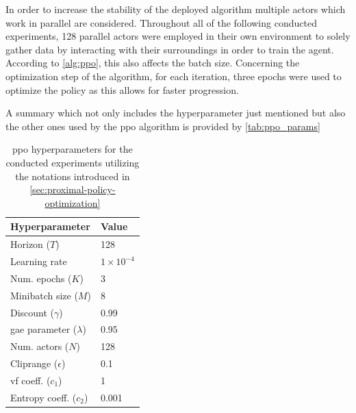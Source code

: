 \documentclass[draft,final]{vutinfth} %
\begin{document}
    In order to increase the stability of the deployed algorithm multiple actors which work in parallel are considered.
    Throughout all of the following conducted experiments, 128 parallel actors were employed in their own environment to solely gather data by interacting with their surroundings in order to train the agent.
    According to \autoref{alg:ppo}, this also affects the batch size.
    Concerning the optimization step of the algorithm, for each iteration, three epochs were used to optimize the policy as this allows for faster progression.

    A summary which not only includes the hyperparameter just mentioned but also the other ones used by the \gls{ppo} algorithm is provided by \autoref{tab:ppo_params}

    \begin{table}[h]
        \centering
        \begin{tabular}{|l|l|}
            \hline
            Hyperparameter                       & Value              \\
            \hline
            Horizon ($T$)                        & 128                \\
            Learning rate                        & $1 \times 10^{-4}$ \\
            Num. epochs  ($K$)                     & 3                  \\
            Minibatch size ($M$)                 & 8                  \\
            Discount ($\gamma$)                  & 0.99               \\
            \acrshort{gae} parameter ($\lambda$) & 0.95               \\
            Num. actors ($N$)                    & 128                \\
            Cliprange ($\epsilon$)               & 0.1                \\
            \acrshort{vf} coeff. ($c_1$)         & 1                  \\
            Entropy coeff. ($c_2$)               & 0.001              \\
            \hline
        \end{tabular}
        \caption[\acrlong{ppo} hyperparameters for the conducted experiments]{\gls{ppo} hyperparameters for the conducted experiments utilizing the notations introduced in \autoref{sec:proximal-policy-optimization}}
        \label{tab:ppo_params}
    \end{table}
\end{document}
